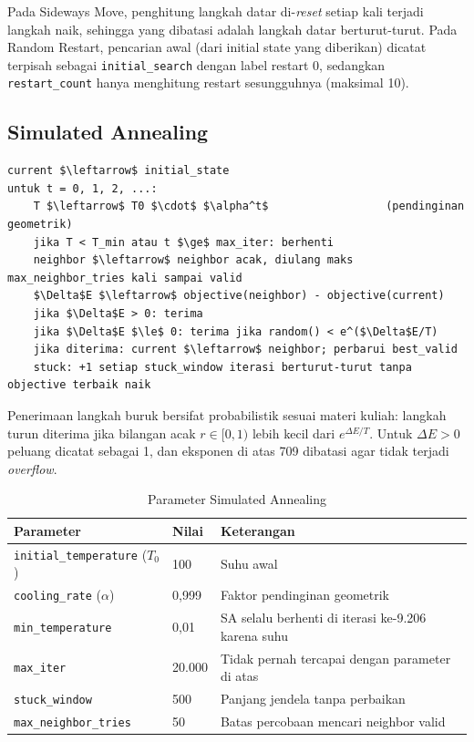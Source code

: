 \documentclass[12pt,a4paper]{report}
\newcommand{\hd}[1]{\cellcolor{hdr}\textbf{#1}}
\newcommand{\code}[1]{\texttt{\small #1}}
\begin{document}
Pada Sideways Move, penghitung langkah datar di-\textit{reset} setiap kali terjadi langkah naik,
sehingga yang dibatasi adalah langkah datar berturut-turut. Pada Random Restart, pencarian awal
(dari initial state yang diberikan) dicatat terpisah sebagai \code{initial\_search} dengan label
restart 0, sedangkan \code{restart\_count} hanya menghitung restart sesungguhnya (maksimal 10).

\subsection{Simulated Annealing}
\begin{lstlisting}[mathescape]
current $\leftarrow$ initial_state
untuk t = 0, 1, 2, ...:
    T $\leftarrow$ T0 $\cdot$ $\alpha^t$                  (pendinginan geometrik)
    jika T < T_min atau t $\ge$ max_iter: berhenti
    neighbor $\leftarrow$ neighbor acak, diulang maks max_neighbor_tries kali sampai valid
    $\Delta$E $\leftarrow$ objective(neighbor) - objective(current)
    jika $\Delta$E > 0: terima
    jika $\Delta$E $\le$ 0: terima jika random() < e^($\Delta$E/T)
    jika diterima: current $\leftarrow$ neighbor; perbarui best_valid
    stuck: +1 setiap stuck_window iterasi berturut-turut tanpa objective terbaik naik
\end{lstlisting}

Penerimaan langkah buruk bersifat probabilistik sesuai materi kuliah: langkah turun diterima jika bilangan acak
$r \in [0,1)$ lebih kecil dari $e^{\Delta E/T}$. Untuk $\Delta E > 0$ peluang dicatat sebagai 1, dan
eksponen di atas 709 dibatasi agar tidak terjadi \textit{overflow}.

\begin{table}[H]
\centering
\caption{Parameter Simulated Annealing}\label{tab:paramsa}
\small
\begin{tabular}{|L{4.2cm}|C{2cm}|L{7cm}|}
\hline
\hd{Parameter} & \hd{Nilai} & \hd{Keterangan} \\ \hline
\code{initial\_temperature} ($T_0$) & 100 & Suhu awal \\ \hline
\code{cooling\_rate} ($\alpha$) & 0,999 & Faktor pendinginan geometrik \\ \hline
\code{min\_temperature} & 0,01 & SA selalu berhenti di iterasi ke-9.206 karena suhu \\ \hline
\code{max\_iter} & 20.000 & Tidak pernah tercapai dengan parameter di atas \\ \hline
\code{stuck\_window} & 500 & Panjang jendela tanpa perbaikan \\ \hline
\code{max\_neighbor\_tries} & 50 & Batas percobaan mencari neighbor valid \\ \hline
\end{tabular}
\end{table}
\end{document}
